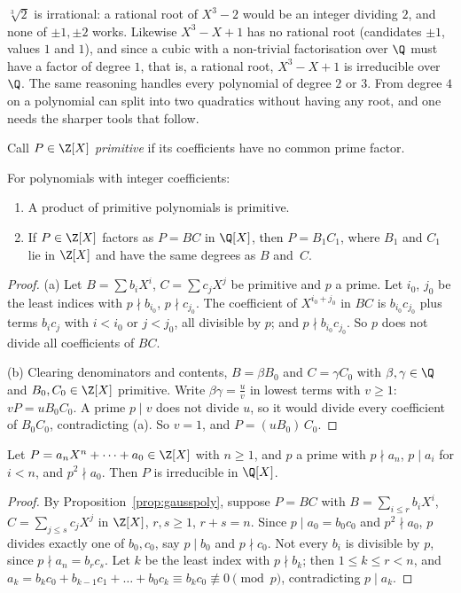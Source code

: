 \begin{examplex}
$\sqrt[3]2$ is irrational: a rational root of $X^3-2$ would be an integer dividing $2$, and none of $\pm1,\pm2$ works. Likewise $X^3-X+1$ has no
rational root (candidates $\pm1$, values $1$ and $1$), and since a cubic with a non-trivial factorisation over $\Q$ must have a factor of degree $1$,
that is, a rational root, $X^3-X+1$ is irreducible over $\Q$. The same reasoning handles every polynomial of degree $2$ or $3$. From degree $4$ on a
polynomial can split into two quadratics without having any root, and one needs the sharper tools that follow.
\end{examplex}

Call $P\in\Z[X]$ \emph{primitive} if its coefficients have no common prime factor.

\begin{proposition}\label{prop:gausspoly}
For polynomials with integer coefficients:
\begin{enumerate}[label=(\alph*)]
\item A product of primitive polynomials is primitive.
\item If $P\in\Z[X]$ factors as $P=BC$ in $\Q[X]$, then $P=B_1C_1$, where $B_1$ and $C_1$ lie in $\Z[X]$ and have the same degrees as $B$ and~$C$.
\end{enumerate}
\end{proposition}
\begin{proof}
(a) Let $B=\sum b_iX^i$, $C=\sum c_jX^j$ be primitive and $p$ a prime. Let $i_0$, $j_0$ be the least indices with $p\nmid b_{i_0}$, $p\nmid c_{j_0}$. The coefficient of $X^{i_0+j_0}$ in $BC$ is $b_{i_0}c_{j_0}$ plus terms $b_ic_j$ with $i<i_0$ or $j<j_0$, all divisible by $p$; and $p\nmid b_{i_0}c_{j_0}$. So $p$ does not divide all coefficients of $BC$.

(b) Clearing denominators and contents, $B=\beta B_0$ and $C=\gamma C_0$ with $\beta,\gamma\in\Q$ and $B_0,C_0\in\Z[X]$ primitive. Write $\beta\gamma=\frac uv$ in lowest terms with $v\ge1$: $vP=uB_0C_0$. A prime $p\mid v$ does not divide $u$, so it would divide every coefficient of $B_0C_0$, contradicting (a). So $v=1$, and $P=(uB_0)\,C_0$.
\end{proof}

\begin{theorem}\label{thm:eisenstein}
Let $P=a_nX^n+\dots+a_0\in\Z[X]$ with $n\ge1$, and $p$ a prime with $p\nmid a_n$, $p\mid a_i$ for $i<n$, and $p^2\nmid a_0$. Then $P$ is irreducible in $\Q[X]$.
\end{theorem}
\begin{proof}
By Proposition~\ref{prop:gausspoly}, suppose $P=BC$ with $B=\sum_{i\le r}b_iX^i$, $C=\sum_{j\le s}c_jX^j$ in $\Z[X]$, $r,s\ge1$, $r+s=n$. Since $p\mid a_0=b_0c_0$ and $p^2\nmid a_0$, $p$ divides exactly one of $b_0,c_0$, say $p\mid b_0$ and $p\nmid c_0$. Not every $b_i$ is divisible by $p$, since $p\nmid a_n=b_rc_s$. Let $k$ be the least index with $p\nmid b_k$; then $1\le k\le r<n$, and
$a_k=b_kc_0+b_{k-1}c_1+\dots+b_0c_k\equiv b_kc_0\not\equiv0\pmod p$, contradicting $p\mid a_k$.
\end{proof}

